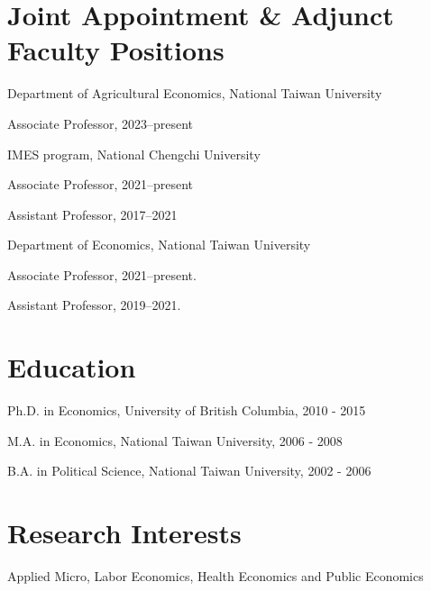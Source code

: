 \documentclass[10pt,letterpaper]{article}
\renewenvironment{itemize}{
  \begin{list}{}{
      \setlength{\leftmargin}{1.5em}
      \setlength{\itemsep}{0.25em}
      \setlength{\parskip}{0pt}
      \setlength{\parsep}{0.25em}
    }
}{
  \end{list}
}
\begin{document}
\section*{\textbf{Joint Appointment \& Adjunct Faculty Positions}}
\begin{itemize}
\item Department of Agricultural Economics, National Taiwan University
\begin{itemize}
	\item Associate Professor, 2023--present
\end{itemize}

\item IMES program, National Chengchi University
\begin{itemize}
	\item Associate Professor, 2021--present
	\item Assistant Professor, 2017--2021
\end{itemize}

\item Department of Economics, National Taiwan University
\begin{itemize}
	\item Associate Professor, 2021--present.
	\item Assistant Professor, 2019--2021.
\end{itemize}


\end{itemize}

\section*{\textbf{Education}}

\begin{itemize}
  \item Ph.D. in Economics, University of British Columbia, 2010 - 2015
  \item M.A. in Economics, National Taiwan University, 2006 - 2008
  \item B.A. in Political Science, National Taiwan University, 2002 - 2006
\end{itemize}

\section*{\textbf{Research Interests}}

Applied Micro, Labor Economics, Health Economics and Public Economics
\end{document}
